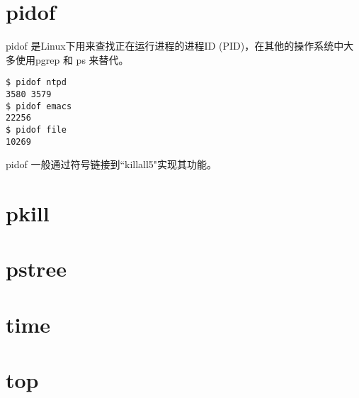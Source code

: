 \section{pidof} 

pidof 是Linux下用来查找正在运行进程的进程ID (PID)，在其他的操作系统中大多使用pgrep 和 ps 来替代。

\begin{verbatim}
$ pidof ntpd
3580 3579
$ pidof emacs
22256
$ pidof file
10269
\end{verbatim}



pidof 一般通过符号链接到“killall5"实现其功能。

\section{pkill} 



\section{pstree} 



\section{time} 



\section{top}




































